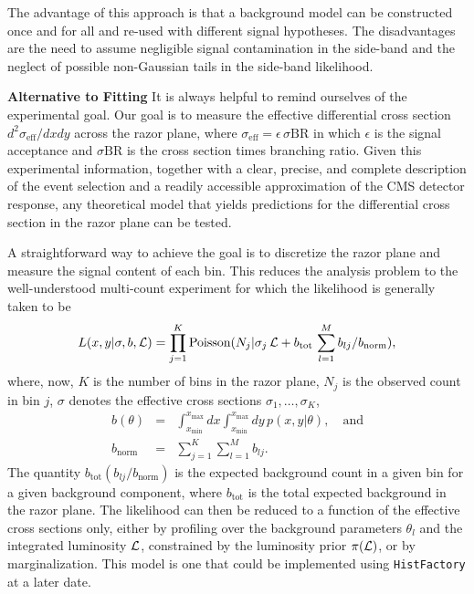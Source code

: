 \documentclass[aps,prd,preprint]{revtex4}
\begin{document}
The advantage of this approach is that a background model can be constructed once and for
all and re-used with different signal hypotheses. The disadvantages are the need to assume
negligible signal contamination in the side-band and the neglect of possible non-Gaussian tails in the side-band likelihood.

\bigskip

\noindent
{\bf \large Alternative to Fitting}
It is always helpful to remind ourselves of the experimental goal. Our goal
is to measure
the effective differential cross section $d^2\sigma_\text{eff}/dx dy$ across the razor plane, where
$\sigma_\text{eff} = \epsilon \, \sigma \text{BR}$ in which $\epsilon$ is the signal acceptance and
$\sigma \text{BR}$ is the cross section times branching ratio. 
Given this experimental information, together with a clear, precise, and complete description of
the event selection and a readily accessible approximation of the CMS detector response, any 
theoretical model that yields predictions for the differential cross section in the razor plane can 
be tested.

A straightforward way to achieve the goal is to discretize the razor plane and measure the signal
content of each bin. This reduces the analysis problem to the well-understood multi-count
experiment for which the likelihood is generally taken to be
\begin{equation}
	L(x, y|\sigma, b, {\cal L}) = \prod_{j=1}^K \text{Poisson}(N_j| \sigma_j \, {\cal L} +  b_\text{tot} \,\sum_{l=1}^M b_{lj} / b_\text{norm}),
\end{equation}
where, now, $K$ is the number of bins in the razor plane, $N_j$ is the observed count
in bin $j$, $\sigma$ denotes the effective cross sections $\sigma_1,\ldots,\sigma_K$, 
\begin{eqnarray}
	b(\theta) & = & \int_{x_\text{min}}^{x_\text{max}}  dx \int_{x_\text{min}}^{x_\text{max}} dy  \, p(x, y|\theta), \quad \text{and} \\ \nonumber
	b_\text{norm} & = & \sum_{j=1}^K \sum_{l=1}^M b_{lj}.
\end{eqnarray}
The quantity $b_\text{tot} (b_{lj} / b_\text{norm})$ is the expected background count in a given bin for a given background component,
where $b_\text{tot}$ is the total expected background in the razor plane. The likelihood can
then be reduced to a function of the effective cross sections only, either by profiling over the 
background parameters $\theta_l$ and the integrated luminosity ${\cal L}$, constrained 
by the luminosity prior $\pi({\cal L})$, or by marginalization. This model is one that could be implemented using {\tt HistFactory} at a later date.
%
\end{document}
